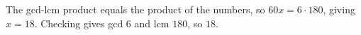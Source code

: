 The gcd-lcm product equals the product of the numbers, so $60x=6\cdot180$, giving $x=18$. Checking gives gcd $6$ and lcm $180$, so $\boxed{18}$.
